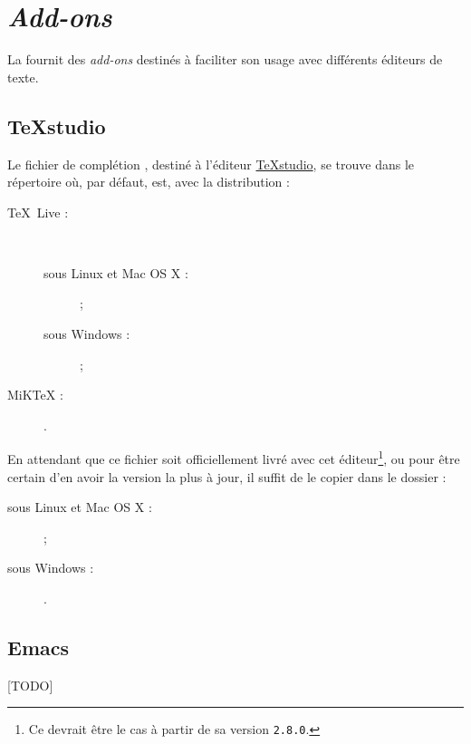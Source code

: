 \chapter{\emph{Add-ons}}\label{cha:add-ons}

La \yatcl{} fournit des \emph{add-ons} destinés à faciliter son usage avec
différents éditeurs de texte.

\section{TeXstudio}
\label{sec:texstudio}

Le fichier de complétion , destiné à l'éditeur
\href{http://texstudio.sourceforge.net/}{TeXstudio}, se trouve dans le
répertoire  où,
par défaut,  est, avec la distribution :
\begin{description}
\item[\TeX{}~Live :]\
  \begin{description}
  \item[sous Linux et Mac OS X :] \unixtldirectory\tldistdirectory\versiontl ;
  \item[sous Windows :] \wintldirectory\tldistdirectory\versiontl ;
  \end{description}
\item[MiK\TeX{} :] \miktexdistdirectory.
\end{description}
En attendant que ce fichier soit officiellement livré avec cet
éditeur\footnote{Ce devrait être le cas à partir de sa version
  \texttt{2.8.0}.}, ou pour être certain d'en avoir la version la plus à jour,
il suffit de le copier dans le dossier :
\begin{description}
\item[sous Linux et Mac OS X :]  ;
\item[sous Windows :] .
\end{description}

\section{Emacs}
\label{sec:emacs}

[TODO]
%
\iffalse
\fi
